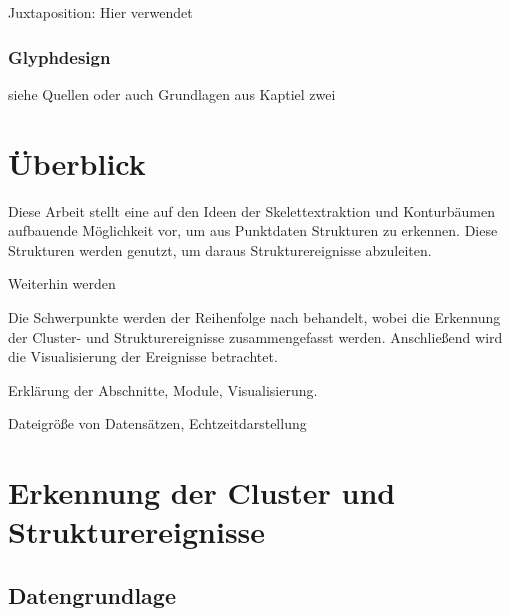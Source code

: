 Juxtaposition: Hier verwendet

\subsection*{Glyphdesign}

siehe Quellen oder auch Grundlagen aus Kaptiel zwei


\chapter{Überblick}

Diese Arbeit stellt eine auf den Ideen der Skelettextraktion und Konturbäumen aufbauende Möglichkeit vor, um aus Punktdaten Strukturen zu erkennen. Diese Strukturen werden genutzt, um daraus Strukturereignisse abzuleiten.

Weiterhin werden %


Die Schwerpunkte werden der Reihenfolge nach behandelt, wobei die Erkennung der Cluster- und Strukturereignisse zusammengefasst werden. Anschließend wird die Visualisierung der Ereignisse betrachtet.

Erklärung der Abschnitte, Module, Visualisierung.

Dateigröße von Datensätzen, Echtzeitdarstellung

\chapter{Erkennung der Cluster und Strukturereignisse}

\section{Datengrundlage}


